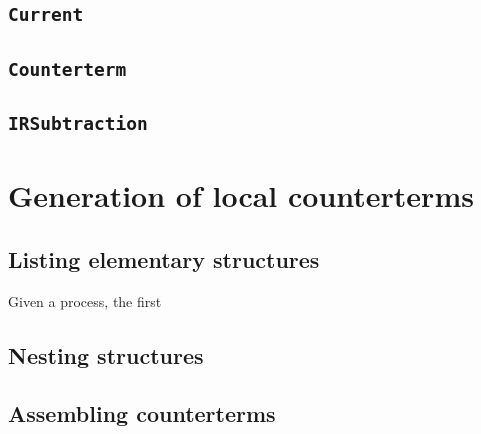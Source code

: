 \documentclass[11pt,a4paper]{article}
\newcommand{\py}[1]{\lstinline[language=python]{#1}}
\begin{document}
\subsection{\py{Current}}


\subsection{\py{Counterterm}}


\subsection{\py{IRSubtraction}}


\section{Generation of local counterterms}
\label{sec:generation}

\subsection{Listing elementary structures}
\label{ssec:elementary}

Given a process, the first 

\subsection{Nesting structures}
\label{ssec:nest}

\subsection{Assembling counterterms}
\label{ssec:counterterms}

\begin{thebibliography}{9}

\end{thebibliography}
\end{document}
